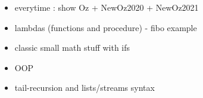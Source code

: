 \begin{itemize}
    \item everytime : show Oz + NewOz2020 + NewOz2021
    \item lambdas (functions and procedure) - fibo example
    \item classic small math stuff with ifs
    \item OOP
    \item tail-recursion and lists/streams syntax
\end{itemize}

